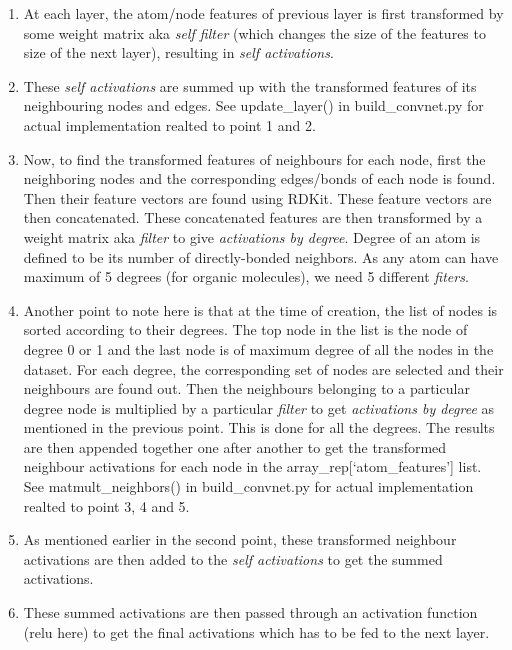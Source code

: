 \documentclass[10pt,a4paper,Times new roman]{report}
\begin{document}
 \begin{enumerate}
 \item At each layer, the atom/node features of previous layer is first transformed by some weight matrix aka \textit{self filter} (which changes the size of the features to size of the next layer), resulting in \textit{self activations}.
 
 \item These \textit{self activations} are summed up with the transformed features of its neighbouring nodes and edges. See update\_layer() in build\_convnet.py for actual implementation realted to point 1 and 2.
 
 \item Now, to find the transformed features of neighbours for each node, first the neighboring nodes and the corresponding edges/bonds of each node is found. Then their feature vectors are found using RDKit. These feature vectors are then concatenated. These concatenated features are then transformed by a weight matrix aka \textit{filter} to give \textit{activations by degree}. Degree of an atom is defined to be its number of directly-bonded neighbors. As any atom can have maximum of 5 degrees (for organic molecules), we need 5 different \textit{fiters}. 
 
 \item Another point to note here is that at the time of creation, the list of nodes is sorted according to their degrees. The top node in the list is the node of degree 0 or 1 and the last node is of maximum degree of all the nodes in the dataset. For each degree, the corresponding set of nodes are selected and their neighbours are found out. Then the neighbours belonging to a particular degree node is multiplied by a particular \textit{filter} to get \textit{activations by degree} as mentioned in the previous point. This is done for all the degrees. The results are then appended together one after another to get the transformed neighbour activations for each node in the array\_rep[`atom\_features'] list. See matmult\_neighbors() in build\_convnet.py for actual implementation realted to point 3, 4 and 5.
 
 \item As mentioned earlier in the second point, these transformed neighbour activations are then added to the \textit{self activations} to get the summed activations. 
 
 \item These summed activations are then passed through an activation function (relu here) to get the final activations which has to be fed to the next layer. 
 
 \end{enumerate}
 
\end{document}
